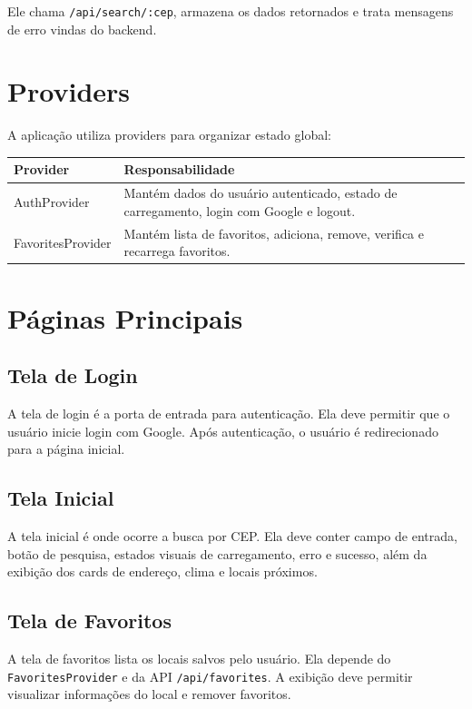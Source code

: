 \documentclass[
    12pt,
    oneside,
    openright,
    a4paper,
    english,
    brazil
]{abntex2}
\begin{document}
Ele chama \texttt{/api/search/:cep}, armazena os dados retornados e trata mensagens de erro vindas do backend.

\section{Providers}

A aplicação utiliza providers para organizar estado global:

\begin{longtable}{|p{4cm}|p{10cm}|}
\hline
\textbf{Provider} & \textbf{Responsabilidade} \\
\hline
AuthProvider & Mantém dados do usuário autenticado, estado de carregamento, login com Google e logout. \\
\hline
FavoritesProvider & Mantém lista de favoritos, adiciona, remove, verifica e recarrega favoritos. \\
\hline
\end{longtable}

\section{Páginas Principais}

\subsection{Tela de Login}

A tela de login é a porta de entrada para autenticação. Ela deve permitir que o usuário inicie login com Google. Após autenticação, o usuário é redirecionado para a página inicial.

\subsection{Tela Inicial}

A tela inicial é onde ocorre a busca por CEP. Ela deve conter campo de entrada, botão de pesquisa, estados visuais de carregamento, erro e sucesso, além da exibição dos cards de endereço, clima e locais próximos.

\subsection{Tela de Favoritos}

A tela de favoritos lista os locais salvos pelo usuário. Ela depende do \texttt{FavoritesProvider} e da API \texttt{/api/favorites}. A exibição deve permitir visualizar informações do local e remover favoritos.
\end{document}
